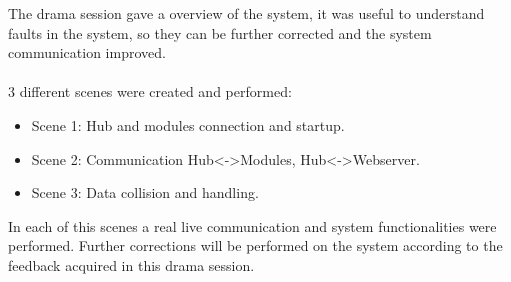 The drama session gave a overview of the system, it was useful to understand faults in the system, so they can be further corrected and the system communication improved.
\\
\\3 different scenes were created and performed:\\
\begin{itemize}
	\item Scene 1: Hub and modules connection and startup.
	\item Scene 2: Communication Hub<->Modules, Hub<->Webserver.
	\item Scene 3: Data collision and handling.
\end{itemize}
In each of this scenes a real live communication and system functionalities were performed. 
Further corrections will be performed on the system according to the feedback acquired in this drama session.





